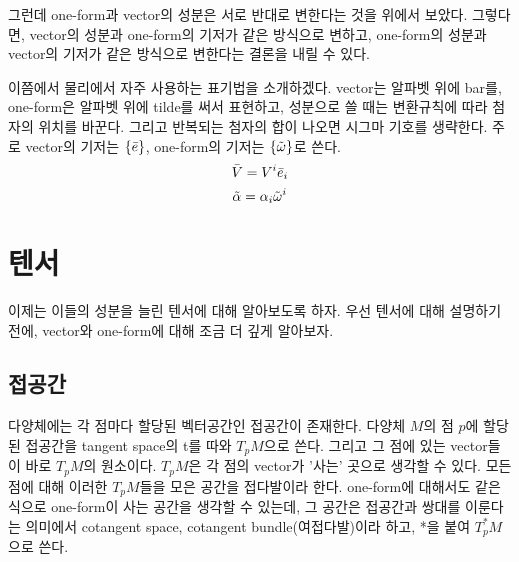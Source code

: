 그런데 one-form과 vector의 성분은 서로 반대로 변한다는 것을 위에서 보았다. 그렇다면, vector의 성분과 one-form의 기저가 같은 방식으로 변하고, one-form의 성분과 vector의 기저가 같은 방식으로 변한다는 결론을 내릴 수 있다.

이쯤에서 물리에서 자주 사용하는 표기법을 소개하겠다. vector는 알파벳 위에 bar를, one-form은 알파벳 위에 tilde를 써서 표현하고, 성분으로 쓸 때는 변환규칙에 따라 첨자의 위치를 바꾼다. 그리고 반복되는 첨자의 합이 나오면 시그마 기호를 생략한다. 주로 vector의 기저는 $\{\Bar{e}\}$, one-form의 기저는 $\{\Tilde{\omega}\}$로 쓴다.
\begin{equation}
    \Bar{V}=V^i \Bar{e}_i
\end{equation}
\begin{equation}
    \Tilde{\alpha}=\alpha_i \Tilde{\omega}^i
\end{equation}
\section{텐서}
이제는 이들의 성분을 늘린 텐서에 대해 알아보도록 하자. 우선 텐서에 대해 설명하기 전에, vector와 one-form에 대해 조금 더 깊게 알아보자.
\subsection{접공간}
다양체에는 각 점마다 할당된 벡터공간인 접공간이 존재한다. 다양체 $M$의 점 $p$에 할당된 접공간을 tangent space의 t를 따와 $T_p M$으로 쓴다. 그리고 그 점에 있는 vector들이 바로 $T_p M$의 원소이다. $T_p M$은 각 점의 vector가 '사는' 곳으로 생각할 수 있다. 모든 점에 대해 이러한 $T_p M$들을 모은 공간을 접다발이라 한다.
one-form에 대해서도 같은 식으로 one-form이 사는 공간을 생각할 수 있는데, 그 공간은 접공간과 쌍대를 이룬다는 의미에서 cotangent space, cotangent bundle(여접다발)이라 하고, *을 붙여 $T_p^* M$으로 쓴다.
